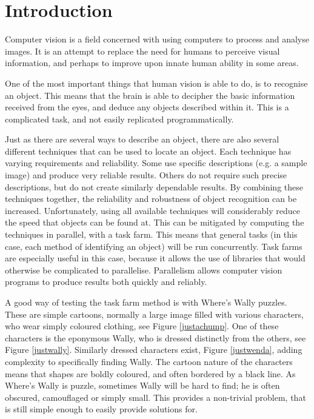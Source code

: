 \documentclass[../main.tex]{subfiles}
\begin{document}
  \section{Introduction}
    Computer vision is a field concerned with using computers to process and analyse images. 
    It is an attempt to replace the need for humans to perceive visual information, and perhaps to improve upon innate human ability in some areas.

    One of the most important things that human vision is able to do, is to recognise an object. 
    This means that the brain is able to decipher the basic information received from the eyes, and deduce any objects described within it.
    This is a complicated task, and not easily replicated programmatically.

    Just as there are several ways to describe an object, there are also several different techniques that can be used to locate an object.
    Each technique has varying requirements and reliability.
    Some use specific descriptions (e.g. a sample image) and produce very reliable results.
    Others do not require such precise descriptions, but do not create similarly dependable results.
    By combining these techniques together, the reliability and robustness of object recognition can be increased.
    Unfortunately, using all available techniques will considerably reduce the speed that objects can be found at.
    This can be mitigated by computing the techniques in parallel, with a task farm.
    This means that general tasks (in this case, each method of identifying an object) will be run concurrently.
    Task farms are especially useful in this case, because it allows the use of libraries that would otherwise be complicated to parallelise.
    Parallelism allows computer vision programs to produce results both quickly and reliably.

    A good way of testing the task farm method is with Where's Wally puzzles.
    These are simple cartoons, normally a large image filled with various characters, who wear simply coloured clothing, see Figure \ref{justachump}.
    One of these characters is the eponymous Wally, who is dressed distinctly from the others, see Figure \ref{justwally}.
    Similarly dressed characters exist, Figure \ref{justwenda}, adding complexity to specifically finding Wally.
    The cartoon nature of the characters means that shapes are boldly coloured, and often bordered by a black line.
    As Where's Wally is puzzle, sometimes Wally will be hard to find; he is often obscured, camouflaged or simply small.
    This provides a non-trivial problem, that is still simple enough to easily provide solutions for.
\end{document}
